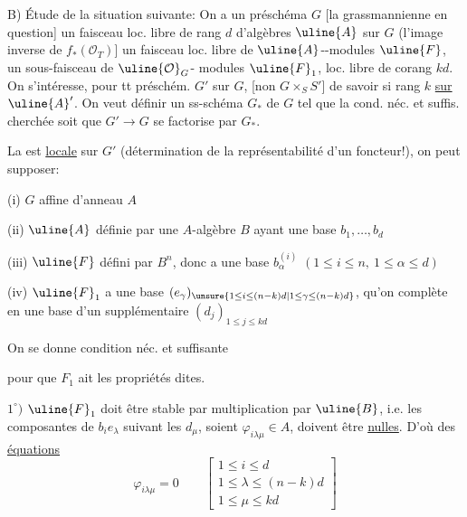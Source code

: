 B) Étude de la situation suivante: On a un préschéma $G$ [la grassmannienne en question] un faisceau loc. libre de rang $d$ d'algèbres $\uline{A}$ sur $G$ (l'image inverse de $f_*(\mathcal O_T)$] un faisceau loc. libre de $\uline{A}$--modules $\uline{F}$, un sous-faisceau de $\uline{\mathcal O}_G$- modules $\uline{F}_1$,  loc. libre de corang $kd$.
On s'intéresse, pour tt préschém. $G'$ sur $G$, [non $G\times_S S'$] de savoir si    rang $k$ \uline{sur $\uline{A}'$}. On veut définir un ss-schéma  $G_*$ de $G$ tel que la cond. néc. et suffis. cherchée soit que $G'\longrightarrow G$ se factorise par $G_*$.

La   est \uline{locale} sur $G'$ (détermination de la représentabilité d'un foncteur!), on peut supposer: 

(i) $G$ affine d'anneau $A$

(ii) $\uline{A}$ définie par une $A$-algèbre $B$ ayant une base $b_1,\ldots,b_d$

(iii) $\uline{F}$ défini par $B^n$, donc a une base $b_\alpha^{(i)}$ $(1\leq i\leq n,\ 1\leq\alpha\leq d)$

(iv) $\uline{F}_1$ a une base  $(e_\gamma)_{\unsure{1\leq i\leq(n-k)d|1\leq\gamma\leq(n-k)d}}$, qu'on complète en une base d'un supplémentaire $(d_j)_{1\leq j\leq kd}$

On se donne   condition néc. et suffisante

pour que $F_1$ ait les propriétés dites. 

$1^\circ)$ $\uline{F}_1$ doit être stable par multiplication par $\uline{B}$, i.e.  les composantes de $b_i e_\lambda$ suivant les $d_\mu$, soient $\varphi_{i\lambda\mu}\in A$, doivent être \uline{nulles}. D'où des \uline{équations}
\[
\varphi_{i\lambda\mu}=0\qquad\left[\begin{array}{l}
1\leq i\leq d\\
1\leq\lambda\leq(n-k)d\\
1\leq\mu\leq kd
\end{array}\right]
\]

